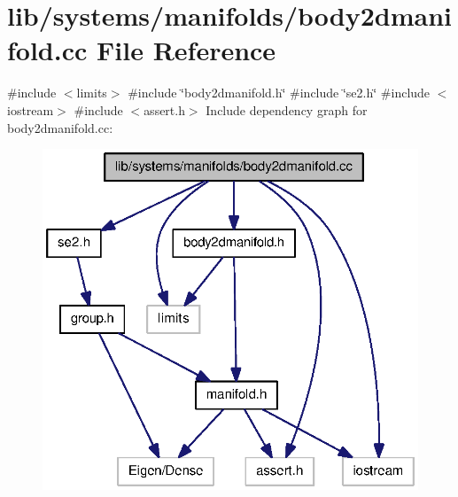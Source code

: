 \section{lib/systems/manifolds/body2dmanifold.cc \-File \-Reference}
\label{body2dmanifold_8cc}
{\ttfamily \#include $<$limits$>$}\*
{\ttfamily \#include \char`\"{}body2dmanifold.\-h\char`\"{}}\*
{\ttfamily \#include \char`\"{}se2.\-h\char`\"{}}\*
{\ttfamily \#include $<$iostream$>$}\*
{\ttfamily \#include $<$assert.\-h$>$}\*
\-Include dependency graph for body2dmanifold.\-cc\-:\nopagebreak
\begin{figure}[H]
\begin{center}
\leavevmode
\includegraphics[width=323pt]{body2dmanifold_8cc__incl}
\end{center}
\end{figure}
